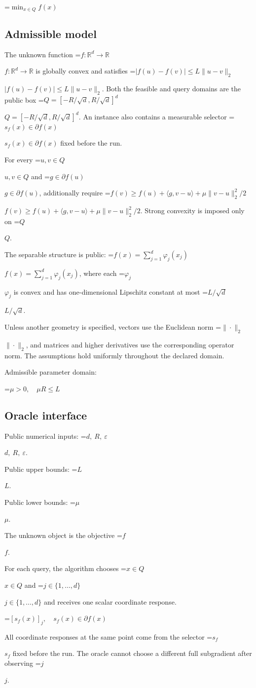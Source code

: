 \documentclass[10pt,a4paper]{article}
\newcommand{\AtlasMath}[1]{\par\begingroup\centering\setbox0=\hbox{$\displaystyle #1$}\ifdim\wd0>1.4\linewidth\typeout{ATLAS WIDE FORMULA: \the\wd0}\fi\ifdim\wd0>\linewidth\resizebox{\linewidth}{!}{\box0}\else\box0\fi\par\endgroup}
\newcommand{\AtlasInlineMath}[1]{\begingroup\setbox0=\hbox{$#1$}\ifdim\wd0>.4\linewidth\endgroup\AtlasMath{#1}\else\endgroup$#1$\fi}
\begin{document}
\AtlasMath{\min_{x\in Q}f(x)}


\subsection{Admissible model}
The unknown function \AtlasInlineMath{f:\mathbb R^d\to\mathbb R} is globally convex and satisfies \AtlasInlineMath{|f(u)-f(v)|\le L\|u-v\|_2}. Both the feasible and query domains are the public box \AtlasInlineMath{Q=[-R/\sqrt d,R/\sqrt d]^d}. An instance also contains a measurable selector \AtlasInlineMath{s_f(x)\in\partial f(x)} fixed before the run.

For every \AtlasInlineMath{u,v\in Q} and \AtlasInlineMath{g\in\partial f(u)}, additionally require \AtlasInlineMath{f(v)\ge f(u)+\langle g,v-u\rangle+\mu\|v-u\|_2^2/2}. Strong convexity is imposed only on \AtlasInlineMath{Q}.

The separable structure is public: \AtlasInlineMath{f(x)=\sum_{j=1}^d\varphi_j(x_j)}, where each \AtlasInlineMath{\varphi_j} is convex and has one-dimensional Lipschitz constant at most \AtlasInlineMath{L/\sqrt d}.

Unless another geometry is specified, vectors use the Euclidean norm \AtlasInlineMath{\|\cdot\|_2}, and matrices and higher derivatives use the corresponding operator norm. The assumptions hold uniformly throughout the declared domain.

Admissible parameter domain:


\AtlasMath{\mu>0,\quad\mu R\le L}


\subsection{Oracle interface}
Public numerical inputs: \AtlasInlineMath{d,\ R,\ \varepsilon}.

Public upper bounds: \AtlasInlineMath{L}.

Public lower bounds: \AtlasInlineMath{\mu}.

The unknown object is the objective \AtlasInlineMath{f}.

For each query, the algorithm chooses \AtlasInlineMath{x\in Q} and \AtlasInlineMath{j\in\{1,\ldots,d\}} and receives one scalar coordinate response.


\AtlasMath{[s_f(x)]_j,\quad s_f(x)\in\partial f(x)}


All coordinate responses at the same point come from the selector \AtlasInlineMath{s_f} fixed before the run. The oracle cannot choose a different full subgradient after observing \AtlasInlineMath{j}.
\end{document}
